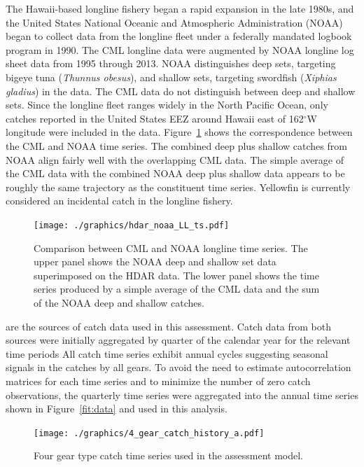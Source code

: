 \documentclass[12pt,letterpaper]{article}
\renewcommand\deg[1]{$^\circ$#1}
\begin{document}
The Hawaii-based longline fishery began a rapid expansion in the late
1980s, and the United States National Oceanic and Atmospheric Administration (NOAA)
began to collect data from the longline fleet under a
federally mandated logbook program in 1990. The CML longline data were
augmented by NOAA longline log sheet data from 1995 through 2013.
NOAA distinguishes deep sets, targeting bigeye tuna ({\it Thunnus
obesus}), and shallow sets,
targeting swordfish ({\it Xiphias gladius}) in the data. 
The CML data do not distinguish between deep and shallow sets.
Since the longline fleet ranges widely in the North Pacific Ocean,
only catches reported in the United States EEZ around Hawaii east of
162\deg{W} longitude were included in the data.
Figure~\ref{fig:hdarnoaaLLTS} shows the correspondence between the
CML and NOAA time series. The combined deep plus shallow catches from
NOAA align fairly well with the overlapping CML data. The simple
average of the CML data with the combined NOAA deep plus shallow data
appears to be roughly the same trajectory as the
constituent time series. Yellowfin is currently considered an incidental catch
in the longline fishery.

\begin{figure}
\begin{center}
\texttt{[image: ./graphics/hdar\_noaa\_LL\_ts.pdf]}
\caption{\label{fig:hdarnoaaLLTS}
Comparison between CML and NOAA longline time series. The upper panel
shows the NOAA deep and shallow set data superimposed on the HDAR
data. The lower panel shows the time series produced by a simple
average of the CML data and the sum of the NOAA deep and shallow
catches.}
\end{center}
\end{figure}

are the sources of catch data used in this assessment. Catch data from
both sources were initially aggregated by quarter of the calendar year for the
relevant time periods 
All catch time series exhibit annual cycles suggesting seasonal
signals in the catches by all gears. To avoid the need to estimate
autocorrelation matrices for each time series and to minimize the
number of zero catch observations, the quarterly time series were
aggregated into the annual time series shown in Figure~\ref{fit:data}
and used in this analysis.

\begin{figure}
\begin{center}
\texttt{[image: ./graphics/4\_gear\_catch\_history\_a.pdf]}
\caption{\label{fig:data}
Four gear type catch time series used in the assessment model.
}
\end{center}
\end{figure}
\end{document}
